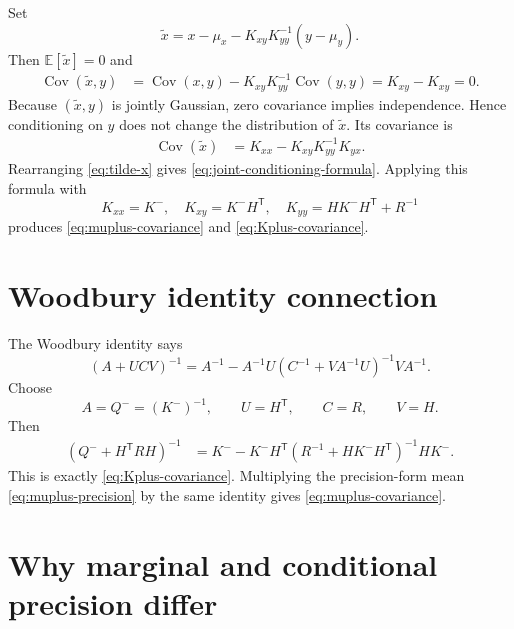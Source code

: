 \documentclass[11pt]{article}
\numberwithin{equation}{section}
\newcommand{\E}{\mathbb{E}}
\newcommand{\Cov}{\operatorname{Cov}}
\newcommand{\transpose}{^{\mathsf T}}
\begin{document}
Set
\begin{equation}
  \tilde x=x-\mu_x-K_{xy}K_{yy}^{-1}(y-\mu_y).
  \label{eq:tilde-x}
\end{equation}
Then $\E[\tilde x]=0$ and
\begin{align}
  \Cov(\tilde x,y)
  &=\Cov(x,y)-K_{xy}K_{yy}^{-1}\Cov(y,y)
  =K_{xy}-K_{xy}=0.
  \label{eq:tilde-uncorrelated-y}
\end{align}
Because $(\tilde x,y)$ is jointly Gaussian, zero covariance implies independence.  Hence conditioning on $y$ does not change the distribution of $\tilde x$.  Its covariance is
\begin{align}
  \Cov(\tilde x)
  &=K_{xx}-K_{xy}K_{yy}^{-1}K_{yx}.
  \label{eq:tilde-covariance}
\end{align}
Rearranging \eqref{eq:tilde-x} gives \eqref{eq:joint-conditioning-formula}.  Applying this formula with
\[
  K_{xx}=K^- ,
  \quad
  K_{xy}=K^-H\transpose,
  \quad
  K_{yy}=HK^-H\transpose+R^{-1}
\]
produces \eqref{eq:muplus-covariance} and \eqref{eq:Kplus-covariance}.

\section{Woodbury identity connection}
\label{app:woodbury}

The Woodbury identity says
\begin{equation}
  (A+UCV)^{-1}
  =A^{-1}-A^{-1}U(C^{-1}+VA^{-1}U)^{-1}VA^{-1}.
  \label{eq:woodbury}
\end{equation}
Choose
\[
  A=Q^-=(K^-)^{-1},
  \qquad
  U=H\transpose,
  \qquad
  C=R,
  \qquad
  V=H.
\]
Then
\begin{align}
  (Q^-+H\transpose RH)^{-1}
  &=K^- - K^-H\transpose(R^{-1}+HK^-H\transpose)^{-1}HK^-.
  \label{eq:woodbury-posterior}
\end{align}
This is exactly \eqref{eq:Kplus-covariance}.  Multiplying the precision-form mean \eqref{eq:muplus-precision} by the same identity gives \eqref{eq:muplus-covariance}.

\section{Why marginal and conditional precision differ}
\label{app:precision-difference}
\end{document}

